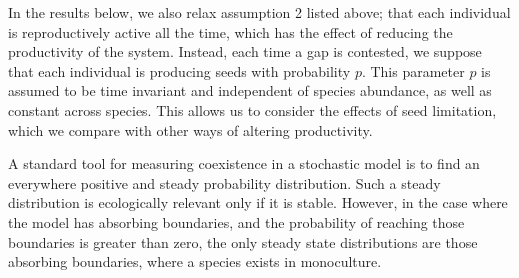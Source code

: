In the results below, we also relax assumption 2 listed above; that each individual is reproductively active all the time, which has the effect of reducing the productivity of the system. Instead, each time a gap is contested, we suppose that each individual is producing seeds with probability $p$. This parameter $p$ is assumed to be time invariant and independent of species abundance, as well as constant across species. This allows us to consider the effects of seed limitation, which we compare with other ways of altering productivity.


A standard tool for measuring coexistence in a stochastic model is to find an everywhere positive and steady probability distribution. Such a steady distribution is ecologically relevant only if it is stable. However, in the case where the model has absorbing boundaries, and the probability of reaching those boundaries is greater than zero, the only steady state distributions are those absorbing boundaries, where a species exists in monoculture. 

